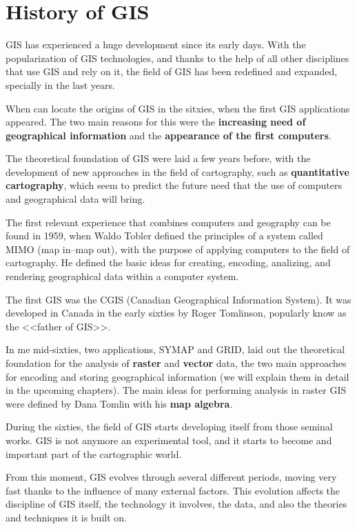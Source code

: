 
\chapter{History of GIS}


\pagestyle{fancy}

GIS has experienced a huge development since its early days. With the popularization of GIS technologies, and thanks to the help of all other disciplines that use GIS and rely on it, the field of GIS has been redefined and expanded, specially in the last years.

When can locate the origins of GIS in the sitxies, when the first GIS applications appeared. The two main reasons for this were the \textbf{increasing need of geographical information} and the \textbf{appearance of the first computers}.

The theoretical foundation of GIS were laid a few years before, with the development of new approaches in the field of cartography, such as \textbf{quantitative cartography}, which seem to predict the future need that the use of computers and geographical data will bring.

The first relevant experience that combines computers and geography can be found in 1959, when Waldo Tobler defined the principles of a system called MIMO (map in--map out), with the purpose of applying computers to the field of cartography. He defined the basic ideas for creating, encoding, analizing, and rendering geographical data within a computer system.

The first GIS was the CGIS (Canadian Geographical Information System). It was developed in Canada in the early sixties by Roger Tomlinson, popularly know as the <<father of GIS>>.

In me mid-sixties, two applications, SYMAP and GRID, laid out the theoretical foundation for the analysis of \textbf{raster} and \textbf{vector} data, the two main approaches for encoding and storing geographical information (we will explain them in detail in the upcoming chapters). The main ideas for performing analysis in raster GIS were defined by Dana Tomlin with his \textbf{map algebra}.

During the sixties, the field of GIS starts developing itself from those seminal works. GIS is not anymore an experimental tool, and it starts to become and important part of the cartographic world.

From this moment, GIS evolves through several different periods, moving very fast thanks to the influence of many external factors. This evolution affects the discipline of GIS itself, the technology it involves, the data, and also the theories and techniques it is built on.



